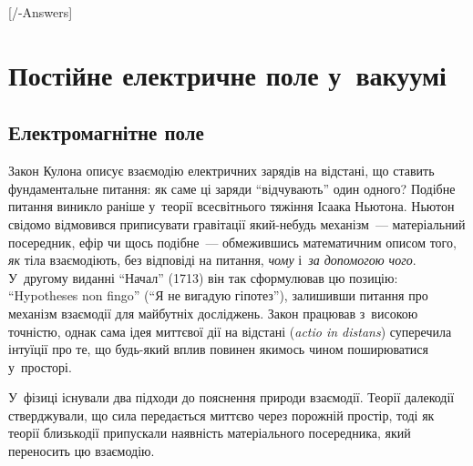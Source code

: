 


[\currfilebase/\currfilebase-Answers]
\chapter{Постійне електричне поле у~вакуумі}\label{\currfilebase}\hypertarget{SteadyEfield}{}
\graphicspath{{\currfilebase/Pictures}}



\section{Електромагнітне поле}\hypertarget{electromagnetic-field}{}

Закон Кулона описує взаємодію електричних зарядів на відстані, що ставить фундаментальне
питання: як саме ці заряди \enquote{відчувають} один одного? Подібне питання виникло
раніше у~теорії всесвітнього тяжіння Ісаака Ньютона. Ньютон свідомо відмовився приписувати
гравітації який-небудь механізм~--- матеріальний посередник, ефір чи щось подібне~---
обмежившись математичним описом того, \emph{як} тіла взаємодіють, без відповіді на
питання, \emph{чому} і~\emph{за допомогою чого}. У~другому виданні \enquote{Начал} (1713)
він так сформулював цю позицію: \enquote{Hypotheses non fingo} (\enquote{Я не вигадую
	гіпотез}), залишивши питання про механізм взаємодії для майбутніх досліджень. Закон
працював з~високою точністю, однак сама ідея миттєвої дії на відстані (\emph{actio
	in distans}) суперечила інтуїції про те, що будь-який вплив повинен якимось чином
поширюватися у~просторі.

У~фізиці існували два підходи до пояснення природи взаємодії. Теорії далекодії
стверджували, що сила передається миттєво через порожній простір, тоді як теорії
близькодії припускали наявність матеріального посередника, який переносить цю взаємодію.

